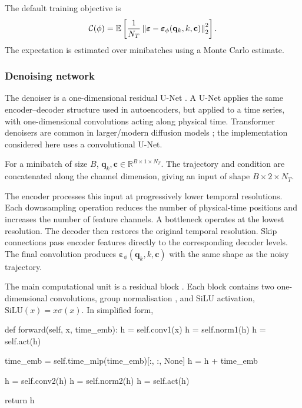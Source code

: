 The default training objective is
\begin{equation}
    \mathcal{C}(\phi)
    =
    \mathbb{E}\left[
        \frac{1}{N_T}
        \left\|
            \boldsymbol{\varepsilon}
            -
            \boldsymbol{\varepsilon}_\phi
            (\mathbf{q}_k,k,\mathbf{c})
        \right\|_2^2
    \right].
    \label{eq:noise_objective}
\end{equation}
The expectation is estimated over minibatches using a Monte Carlo estimate. 

\subsubsection{Denoising network}

The denoiser is a one-dimensional residual U-Net \cite{ronneberger2015unet}. A U-Net applies the same encoder--decoder structure used in autoencoders, but applied to a time series, with one-dimensional convolutions acting along physical time. Transformer denoisers are common in larger/modern diffusion models \cite{peebles2023dit}; the implementation considered here uses a convolutional U-Net.

For a minibatch of size $B$, $\mathbf{q}_k,\mathbf{c}\in\mathbb{R}^{B\times1\times N_T}.$ The trajectory and condition are concatenated along the channel dimension, giving an input of shape $B\times2\times N_T$.

The encoder processes this input at progressively lower temporal resolutions. Each downsampling operation reduces the number of physical-time positions and increases the number of feature channels. A bottleneck operates at the lowest resolution. The decoder then restores the original temporal resolution. Skip connections pass encoder features directly to the corresponding decoder levels. The final convolution produces $\boldsymbol{\varepsilon}_\phi(\mathbf{q}_k,k,\mathbf{c})$ with the same shape as the noisy trajectory.

The main computational unit is a residual block \cite{he2016residual}. Each block contains two one-dimensional convolutions, group normalisation \cite{wu2018groupnorm}, and SiLU activation, $\mathrm{SiLU}(x)=x\sigma(x)$. In simplified form,

\begin{pythonlisting}
def forward(self, x, time_emb):
    h = self.conv1(x)
    h = self.norm1(h)
    h = self.act(h)

    time_emb = self.time_mlp(time_emb)[:, :, None]
    h = h + time_emb

    h = self.conv2(h)
    h = self.norm2(h)
    h = self.act(h)

    return h
\end{pythonlisting}

